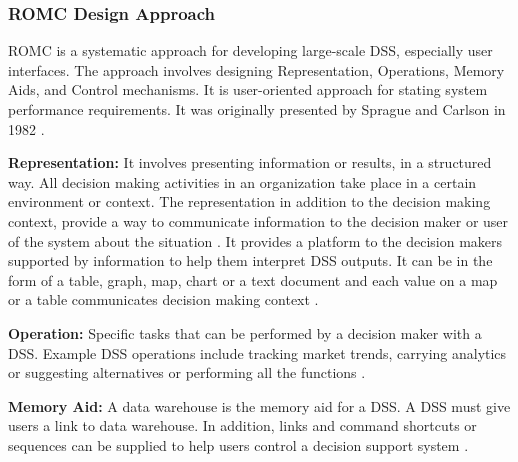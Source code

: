 \subsubsection{ROMC Design Approach}
ROMC is a systematic approach for developing large-scale DSS, especially user interfaces. The approach involves designing Representation, Operations, Memory Aids, and Control mechanisms. It is user-oriented approach for stating system performance requirements. It was originally presented by Sprague and Carlson in 1982 \cite{ROMC}.

\textbf{Representation:} It involves presenting information or results, in a structured way.
All decision making activities in an organization take place in a certain environment or context. The representation in addition to the decision making context, provide a way to communicate information to the decision maker or user of the system about the situation \cite{ROMC,DSS}. It provides a platform to the decision makers supported by information to help them interpret DSS outputs. It can be in the form of a table, graph, map, chart or a text document and each value on a map or a table communicates decision making context \cite{ROMC,DSS}.

\textbf{Operation: }Specific tasks that can be performed by a decision maker with a DSS. Example DSS operations include tracking market trends, carrying analytics or suggesting alternatives or performing all the functions \cite{DSS}.

\textbf{Memory Aid: }A data warehouse is the memory aid for a DSS. A DSS must give users a link to data warehouse. In addition, links and command shortcuts or sequences can be supplied to help users control a decision support system \cite{DSS}.

